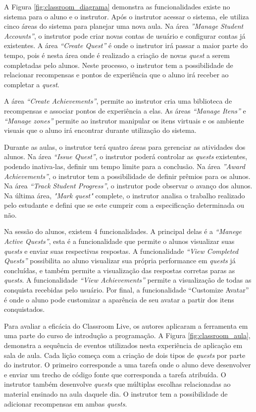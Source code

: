 \documentclass[
	12pt,				%
	oneside,			%
	a4paper,			%
	english,			%
	french,				%
	spanish,			%
	brazil,				%
	]{abntex2}
\begin{document}
A Figura \ref{fig:classroom_diagrama} demonstra as funcionalidades existe no sistema para o aluno e o instrutor.
Após o instrutor acessar o sistema, ele utiliza cinco áreas do sistema para planejar uma nova aula. Na área \textit{”Manage Student Accounts”}, o instrutor pode criar novas contas de usuário e configurar contas já existentes. A área \textit{“Create Quest”} é onde o instrutor irá passar a maior parte do tempo, pois é nesta área onde é realizado a criação de novas \textit{quest} a serem completadas pelo alunos. Neste processo, o instrutor tem a possibilidade de relacionar recompensas e pontos de experiência que o aluno irá receber ao completar a \textit{quest}. 

A área \textit{“Create Achievements”}, permite ao instrutor cria uma biblioteca de recompensas e associar pontos de experiência a elas. As áreas \textit{“Manage Itens”} e \textit{“Manage zones”} permite ao instrutor manipular os itens virtuais e os ambiente visuais que o aluno irá encontrar durante utilização do sistema.

Durante as aulas, o instrutor terá quatro áreas para gerenciar as atividades dos alunos. Na área \textit{“Issue Quest”}, o instrutor poderá controlar as \textit{quests} existentes, podendo inativa-las, definir um tempo limite para a conclusão. Na área \textit{”Award Achievements”}, o instrutor tem a possibilidade de definir prêmios para os alunos. Na área \textit{“Track Student Progress”}, o instrutor pode observar o avanço dos alunos. Na última área, \textit{"Mark quest"} complete, o instrutor analisa o trabalho realizado pelo estudante e defini que se este cumprir com a especificação determinada ou não.

Na sessão do alunos, existem 4 funcionalidades. A principal delas é a \textit{“Manege Active Quests”}, esta é a funcionalidade que permite o alunos visualizar suas \textit{quests} e enviar suas respectivas respostas. A funcionalidade \textit{“View Completed Quests”} possibilita ao aluno visualizar sua própria performance em \textit{quests} já concluídas, e também permite a visualização das respostas corretas paras as \textit{quests}. A funcionalidade \textit{“View Achievements”} permite a visualização de todas as conquista recebidas pelo usuário. Por final, a funcionalidade “Customize Avatar” é onde o aluno pode customizar a aparência de seu avatar a partir dos itens conquistados.

Para avaliar a eficácia do Classroom Live, os autores aplicaram a ferramenta em uma parte do curso de introdução a programação. A Figura \ref{fig:classroom_aula}, demonstra a sequência de eventos utilizados nesta experiência de aplicação em sala de aula. Cada lição começa com a criação de dois tipos de \textit{quests} por parte do instrutor. O primeiro corresponde a uma tarefa onde o aluno deve desenvolver e enviar um trecho de código fonte que corresponda a tarefa atribuída. O instrutor também desenvolve \textit{quests} que múltiplas escolhas relacionadas ao material ensinado na aula daquele dia. O instrutor tem a possibilidade de adicionar recompensas em ambas \textit{quests}.
\end{document}
